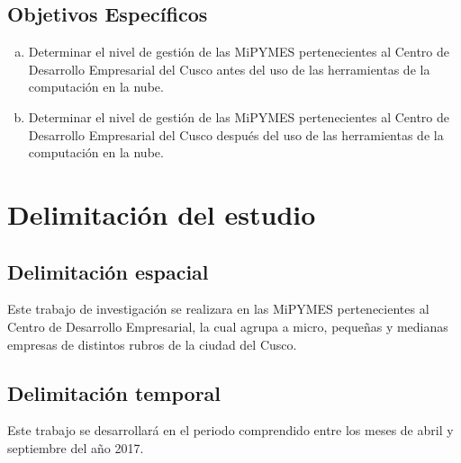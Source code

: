 \subsection{Objetivos Específicos}
\begin{enumerate}[a.]
\item Determinar el nivel de gestión de las MiPYMES pertenecientes al Centro de
Desarrollo Empresarial del Cusco antes del uso de las herramientas de la
computación en la nube.
\item Determinar el nivel de gestión de las MiPYMES pertenecientes al Centro de
Desarrollo Empresarial del Cusco después del uso de las herramientas de la
computación en la nube.
\end{enumerate}
\section{Delimitación del estudio}
\subsection{Delimitación espacial}
Este trabajo de investigación se realizara en las MiPYMES pertenecientes al
Centro de Desarrollo Empresarial, la cual agrupa a micro, pequeñas y
medianas empresas de distintos rubros de la ciudad del Cusco.

\subsection{Delimitación temporal}
Este trabajo se desarrollará en el periodo comprendido entre los meses de abril
y septiembre del año 2017.
